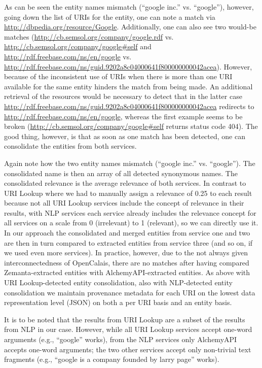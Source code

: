 \documentclass{acm_proc_article-sp}
\begin{document}
As can be seen the entity names mismatch (``google inc.'' vs. ``google''), however, going down the list of URIs for the entity, one can note a match via \url{http://dbpedia.org/resource/Google}. Additionally, one can also see two would-be matches (\url{http://cb.semsol.org/company/google.rdf} vs. \url{http://cb.semsol.org/company/google#self} and \url{http://rdf.freebase.com/ns/en/google} vs. \url{http://rdf.freebase.com/ns/guid.9202a8c04000641f800000000042acea}). However, because of the inconsistent use of URIs when there is more than one URI available for the same entity hinders the match from being made. An additional retrieval of the resources would be necessary to detect that in the latter case \url{http://rdf.freebase.com/ns/guid.9202a8c04000641f800000000042acea} redirects to \url{http://rdf.freebase.com/ns/en/google}, whereas the first example seems to be broken (\url{http://cb.semsol.org/company/google#self} returns status code 404). The good thing, however, is that as soon as one match has been detected, one can consolidate the entities from both services. 

Again note how the two entity names mismatch (``google inc.'' vs. ``google''). The consolidated name is then an array of all detected synonymous names. The consolidated relevance is the average relevance of both services. In contrast to URI Lookup where we had to manually assign a relevance of 0.25 to each result because not all URI Lookup services include the concept of relevance in their results, with NLP services each service already includes the relevance concept for all services on a scale from 0 (irrelevant) to 1 (relevant), so we can directly use it. In our approach the consolidated and merged entities from service one and two are then in turn compared to extracted entities from service three (and so on, if we used even more services). In practice, however, due to the not always given interconnectedness of OpenCalais, there are no matches after having compared Zemanta-extracted entities with AlchemyAPI-extracted entities. As above with URI Lookup-detected entity consolidation, also with NLP-detected entity consolidation we maintain provenance metadata for each URI on the lowest data representation level (JSON) on both a per URI basis and an entity basis.  

It is to be noted that the results from URI Lookup are a subset of the results from NLP in our case. However, while all URI Lookup services accept one-word arguments (e.g., ``google'' works), from the NLP services only AlchemyAPI accepts one-word arguments; the two other services accept only non-trivial text fragments (e.g., ``google is a company founded by larry page'' works). 
\end{document}
